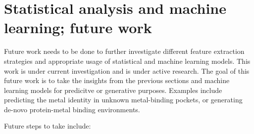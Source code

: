 \documentclass[../main/main]{subfiles}
\begin{document}
\section{Statistical analysis and machine learning; future work}
Future work needs to be done to further investigate different feature extraction strategies and appropriate usage of statistical and machine learning models. This work is under current investigation and is under active research. The goal of this future work is to take the insights from the previous sections and machine learning models for predicitve or generative purposes. Examples include predicting the metal identity in unknown metal-binding pockets, or generating de-novo protein-metal binding environments.

\noindent Future steps to take include:
\end{document}
